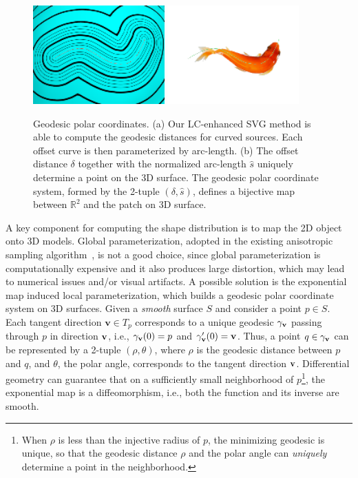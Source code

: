   \begin{figure}[htbp]
  \centering
  \includegraphics[width=0.45\textwidth]{figs/asd/parameterization3.png}
  \includegraphics[width=0.45\textwidth]{figs/asd/parameterization4.png}\\	
   
  \caption{Geodesic polar coordinates.
  (a) Our LC-enhanced SVG method is able to compute the geodesic distances for curved sources.
  Each offset curve is then parameterized by arc-length.
  (b) The offset distance $\delta$ together with the normalized arc-length $\widehat{s}$ uniquely determine a point on the 3D surface.
  The geodesic polar coordinate system, formed by the 2-tuple $(\delta,\widehat{s})$,
  defines a bijective map between $\mathbb{R}^2$ and the patch on 3D surface.
  }
  \label{fig:offsets}
  \end{figure}
  A key component for computing the shape distribution is to map the 2D object onto 3D models.
  Global parameterization, adopted in the existing anisotropic sampling algorithm~\cite{li:anisotropic:2010}, is not a good choice,
  since global parameterization is computationally expensive and it also produces large distortion, which may lead to numerical issues and/or visual artifacts.
  A possible solution is the exponential map induced local parameterization, which builds a geodesic polar coordinate system on 3D surfaces.
  Given a \textit{smooth} surface $S$ and consider a point $p\in S$.
  Each tangent direction $\mathbf{v}\in T_{p}$ corresponds to a unique geodesic $\gamma_{\bf v}$ passing through $p$ in direction $\bf v$,
  i.e., $\gamma_{\bf v}(0)=p$ and $\gamma_{\bf v}'(0)=\bf v$.
  Thus, a point $q\in \gamma_{\bf v}$ can be represented by a 2-tuple $(\rho,\theta)$,
  where $\rho$ is the geodesic distance between $p$ and $q$, and $\theta$, the polar angle, corresponds to the tangent direction $\bf v$.
  Differential geometry can guarantee that on a sufficiently small neighborhood of $p$\footnote{When $\rho$ is less than the injective radius of $p$, the minimizing geodesic is unique,
  so that the geodesic distance $\rho$ and the polar angle can \textit{uniquely} determine a point in the neighborhood.},
  the exponential map is a diffeomorphism, i.e., both the function and its inverse are smooth.

